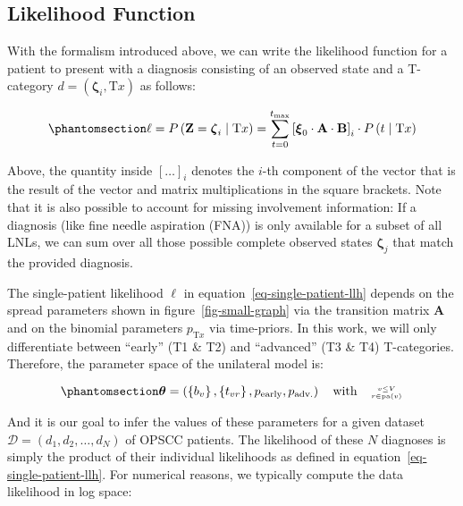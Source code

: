 \documentclass[
  sn-mathphys-num,
]{sn-jnl}
\begin{document}
\subsection{Likelihood Function}\label{likelihood-function}

With the formalism introduced above, we can write the likelihood
function for a patient to present with a diagnosis consisting of an
observed state and a T-category
\(d = \left( \boldsymbol{\zeta}_i, \text{T}x \right)\) as follows:

\begin{equation}\phantomsection\label{eq-single-patient-llh}{
\ell = P \left( \mathbf{Z} = \boldsymbol{\zeta}_i \mid \text{T}x \right) = \sum_{t=0}^{t_\text{max}} \left[ \boldsymbol{\xi}_0 \cdot \mathbf{A} \cdot \mathbf{B} \right]_i \cdot P \left( t \mid \text{T}x \right)
}\end{equation}

Above, the quantity inside \(\left[ \ldots \right]_i\) denotes the
\(i\)-th component of the vector that is the result of the vector and
matrix multiplications in the square brackets. Note that it is also
possible to account for missing involvement information: If a diagnosis
(like fine needle aspiration (FNA)) is only available for a subset of
all LNLs, we can sum over all those possible complete observed states
\(\boldsymbol{\zeta}_j\) that match the provided diagnosis.

The single-patient likelihood \(\ell\) in
equation~\ref{eq-single-patient-llh} depends on the spread parameters
shown in figure~\ref{fig-small-graph} via the transition matrix
\(\mathbf{A}\) and on the binomial parameters \(p_{\text{T}x}\) via
time-priors. In this work, we will only differentiate between ``early''
(T1 \& T2) and ``advanced'' (T3 \& T4) T-categories. Therefore, the
parameter space of the unilateral model is:

\begin{equation}\phantomsection\label{eq-param-space}{
\boldsymbol{\theta} = \left( \left\{ b_v \right\}, \left\{ t_{vr} \right\}, p_\text{early}, p_\text{adv.} \right) \quad \text{with} \quad \genfrac{}{}{0pt}{2}{v\leq V}{r\in\operatorname{pa}(v)}
}\end{equation}

And it is our goal to infer the values of these parameters for a given
dataset \(\mathcal{D} = \left( d_1, d_2, \ldots, d_N \right)\) of OPSCC
patients. The likelihood of these \(N\) diagnoses is simply the product
of their individual likelihoods as defined in
equation~\ref{eq-single-patient-llh}. For numerical reasons, we
typically compute the data likelihood in log space:
\end{document}
